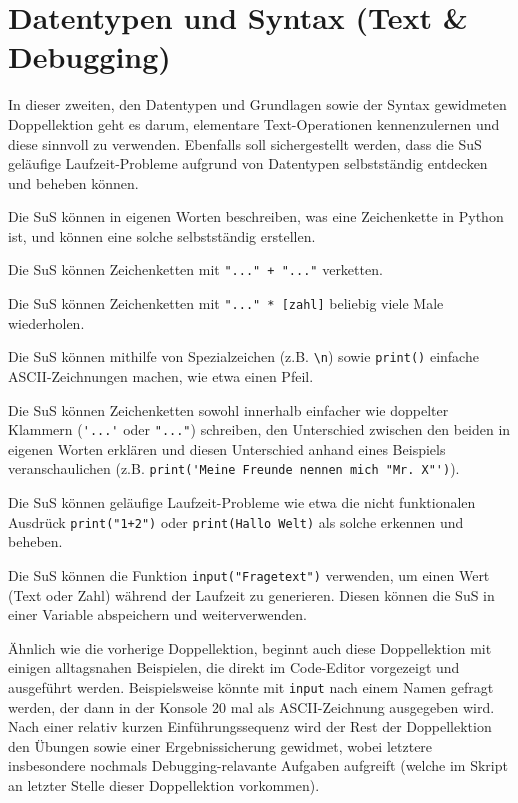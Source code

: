 \section{Datentypen und Syntax (Text \& Debugging)}
\begin{myExBox}
In dieser zweiten, den Datentypen und Grundlagen sowie der Syntax gewidmeten Doppellektion geht es darum, elementare Text-Operationen kennenzulernen und diese sinnvoll zu verwenden. Ebenfalls soll sichergestellt werden, dass die SuS geläufige Laufzeit-Probleme aufgrund von Datentypen selbstständig entdecken und beheben können.


\begin{todolist}
    \item Die SuS können in eigenen Worten beschreiben, was eine Zeichenkette in Python ist, und können eine solche selbstständig erstellen.
    \item Die SuS können Zeichenketten mit \lstinline|"..." + "..."| verketten.
    \item Die SuS können Zeichenketten mit \lstinline|"..." * [zahl]| beliebig viele Male wiederholen.
    \item Die SuS können mithilfe von Spezialzeichen (z.B. \lstinline|\n|) sowie \lstinline|print()| einfache ASCII-Zeichnungen machen, wie etwa einen Pfeil.
    \item Die SuS können Zeichenketten sowohl innerhalb einfacher wie doppelter Klammern (\lstinline|'...'| oder \lstinline|"..."|) schreiben, den Unterschied zwischen den beiden in eigenen Worten erklären und diesen Unterschied anhand eines Beispiels veranschaulichen (z.B. \lstinline|print('Meine Freunde nennen mich "Mr. X"')|).
    \item Die SuS können geläufige Laufzeit-Probleme wie etwa die nicht funktionalen Ausdrück \lstinline|print("1+2")| oder \lstinline|print(Hallo Welt)| als solche erkennen und beheben.
    \item Die SuS können die Funktion \lstinline|input("Fragetext")| verwenden, um einen Wert (Text oder Zahl) während der Laufzeit zu generieren. Diesen können die SuS in einer Variable abspeichern und weiterverwenden.
\end{todolist}


Ähnlich wie die vorherige Doppellektion, beginnt auch diese Doppellektion mit einigen alltagsnahen Beispielen, die direkt im Code-Editor vorgezeigt und ausgeführt werden. Beispielsweise könnte mit \lstinline|input| nach einem Namen gefragt werden, der dann in der Konsole 20 mal als ASCII-Zeichnung ausgegeben wird. Nach einer relativ kurzen Einführungssequenz wird der Rest der Doppellektion den Übungen sowie einer Ergebnissicherung gewidmet, wobei letztere insbesondere nochmals Debugging-relavante Aufgaben aufgreift (welche im Skript an letzter Stelle dieser Doppellektion vorkommen).


\end{myExBox}
